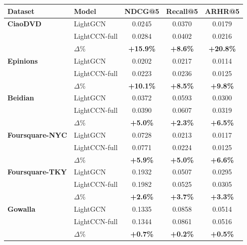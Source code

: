\begin{tabular}{llccc}
\toprule
Dataset & Model & NDCG@5 & Recall@5 & ARHR@5 \\
\midrule
\textbf{CiaoDVD} & LightGCN & 0.0245 & 0.0370 & 0.0179 \\
 & LightCCN-full & 0.0284 & 0.0402 & 0.0216 \\
 & $\Delta$\% & \textbf{+15.9\%} & \textbf{+8.6\%} & \textbf{+20.8\%} \\
\addlinespace
\textbf{Epinions} & LightGCN & 0.0202 & 0.0217 & 0.0114 \\
 & LightCCN-full & 0.0223 & 0.0236 & 0.0125 \\
 & $\Delta$\% & \textbf{+10.1\%} & \textbf{+8.5\%} & \textbf{+9.8\%} \\
\addlinespace
\textbf{Beidian} & LightGCN & 0.0372 & 0.0593 & 0.0300 \\
 & LightCCN-full & 0.0390 & 0.0607 & 0.0319 \\
 & $\Delta$\% & \textbf{+5.0\%} & \textbf{+2.3\%} & \textbf{+6.5\%} \\
\addlinespace
\textbf{Foursquare-NYC} & LightGCN & 0.0728 & 0.0213 & 0.0117 \\
 & LightCCN-full & 0.0771 & 0.0224 & 0.0125 \\
 & $\Delta$\% & \textbf{+5.9\%} & \textbf{+5.0\%} & \textbf{+6.6\%} \\
\addlinespace
\textbf{Foursquare-TKY} & LightGCN & 0.1932 & 0.0507 & 0.0295 \\
 & LightCCN-full & 0.1982 & 0.0525 & 0.0305 \\
 & $\Delta$\% & \textbf{+2.6\%} & \textbf{+3.7\%} & \textbf{+3.3\%} \\
\addlinespace
\textbf{Gowalla} & LightGCN & 0.1335 & 0.0858 & 0.0514 \\
 & LightCCN-full & 0.1344 & 0.0861 & 0.0516 \\
 & $\Delta$\% & \textbf{+0.7\%} & \textbf{+0.2\%} & \textbf{+0.5\%} \\
\bottomrule
\end{tabular}
